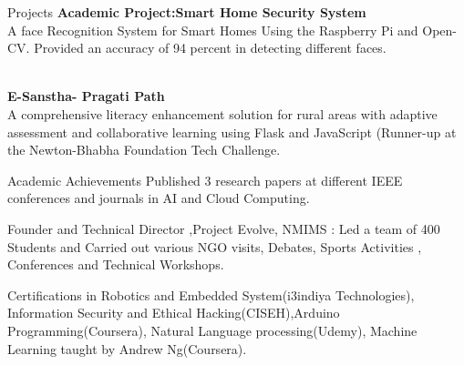 \documentclass{resume} %
\begin{document}
\vspace{-5mm}
\begin{rSection}{Projects}
{\bf Academic Project:Smart Home Security System}
\\A face Recognition System for Smart Homes Using the Raspberry Pi and Open-CV. Provided an accuracy of 94 percent in detecting different faces.\\
\vspace{-5mm}

\\{\bf E-Sanstha- Pragati Path}
\\ A comprehensive literacy enhancement solution for rural areas with adaptive assessment and collaborative learning using Flask and JavaScript (Runner-up at the Newton-Bhabha Foundation Tech Challenge.\\

\end{rSection}

\vspace{-5mm}
\begin{rSection}{Academic Achievements} 
 Published 3 research papers at different IEEE conferences and journals in  AI and Cloud Computing. 
\item Founder and Technical Director ,Project Evolve, NMIMS : Led a team of 400 Students and
Carried out various NGO visits, Debates, Sports Activities , Conferences and Technical Workshops.
\item Certifications in Robotics and Embedded System(i3indiya Technologies), Information Security and Ethical
Hacking(CISEH),Arduino Programming(Coursera), Natural Language processing(Udemy),
Machine Learning taught by Andrew Ng(Coursera).
\end{rSection}

\newpage

\end{document}
